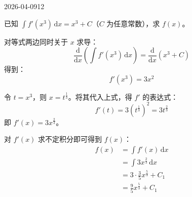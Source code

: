 \begin{mistake}{2026-04-09}{12}

\begin{problemcontent}
已知 \(\displaystyle \int f'(x^3)\,\mathrm{d}x = x^3 + C\)（\(C\) 为任意常数），求 \(f(x)\)。
\end{problemcontent}

\begin{solutioncontent}
对等式两边同时关于 \(x\) 求导：
\[ \frac{\mathrm{d}}{\mathrm{d}x} \left( \int f'(x^3)\,\mathrm{d}x \right) = \frac{\mathrm{d}}{\mathrm{d}x} (x^3 + C) \]
得到：
\[ f'(x^3) = 3x^2 \]

令 \(t = x^3\)，则 \(x = t^{\frac{1}{3}}\)。将其代入上式，得 \(f'\) 的表达式：
\[ f'(t) = 3(t^{\frac{1}{3}})^2 = 3t^{\frac{2}{3}} \]
即 \(f'(x) = 3x^{\frac{2}{3}}\)。

对 \(f'(x)\) 求不定积分即可得到 \(f(x)\)：
\[
\begin{aligned}
f(x) &= \int f'(x) \, \mathrm{d}x \\
&= \int 3x^{\frac{2}{3}} \, \mathrm{d}x \\
&= 3 \cdot \frac{3}{5} x^{\frac{5}{3}} + C_1 \\
&= \frac{9}{5}x^{\frac{5}{3}} + C_1
\end{aligned}
\]
\end{solutioncontent}


\end{mistake}
